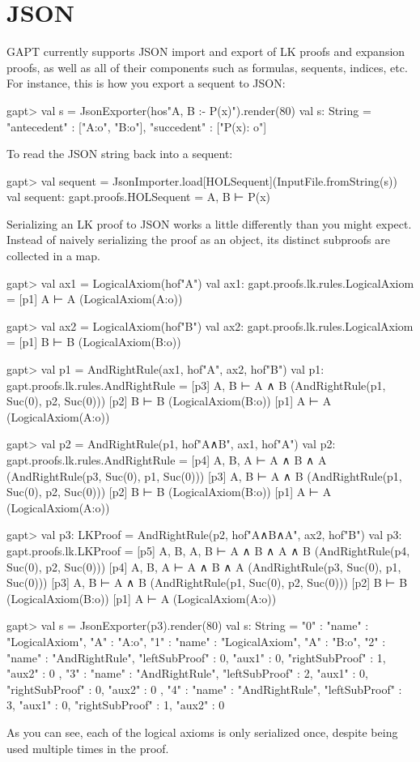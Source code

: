 \documentclass[a4paper,11pt]{book}
\begin{document}
\section{JSON}
GAPT currently supports JSON import and export of LK proofs and expansion proofs,
as well as all of their components such as formulas, sequents, indices, etc. For
instance, this is how you export a sequent to JSON:
\begin{clilisting}
gapt> val s = JsonExporter(hos"A, B :- P(x)").render(80)
val s: String = {"antecedent" : ["A:o", "B:o"], "succedent" : ["P(x): o"]}

\end{clilisting}
To read the JSON string back into a sequent:
\begin{clilisting}
gapt> val sequent = JsonImporter.load[HOLSequent](InputFile.fromString(s))
val sequent: gapt.proofs.HOLSequent = A, B ⊢ P(x)

\end{clilisting}
Serializing an LK proof to JSON works a little differently than you might
expect. Instead of naively serializing the proof as an object, its distinct
subproofs are collected in a map.
\begin{clilisting}
gapt> val ax1 = LogicalAxiom(hof"A")
val ax1: gapt.proofs.lk.rules.LogicalAxiom =
[p1] A ⊢ A    (LogicalAxiom(A:o))

gapt> val ax2 = LogicalAxiom(hof"B")
val ax2: gapt.proofs.lk.rules.LogicalAxiom =
[p1] B ⊢ B    (LogicalAxiom(B:o))

gapt> val p1 = AndRightRule(ax1, hof"A", ax2, hof"B")
val p1: gapt.proofs.lk.rules.AndRightRule =
[p3] A, B ⊢ A ∧ B    (AndRightRule(p1, Suc(0), p2, Suc(0)))
[p2] B ⊢ B    (LogicalAxiom(B:o))
[p1] A ⊢ A    (LogicalAxiom(A:o))

gapt> val p2 = AndRightRule(p1, hof"A∧B", ax1, hof"A")
val p2: gapt.proofs.lk.rules.AndRightRule =
[p4] A, B, A ⊢ A ∧ B ∧ A    (AndRightRule(p3, Suc(0), p1, Suc(0)))
[p3] A, B ⊢ A ∧ B    (AndRightRule(p1, Suc(0), p2, Suc(0)))
[p2] B ⊢ B    (LogicalAxiom(B:o))
[p1] A ⊢ A    (LogicalAxiom(A:o))

gapt> val p3: LKProof = AndRightRule(p2, hof"A∧B∧A", ax2, hof"B")
val p3: gapt.proofs.lk.LKProof =
[p5] A, B, A, B ⊢ A ∧ B ∧ A ∧ B    (AndRightRule(p4, Suc(0), p2, Suc(0)))
[p4] A, B, A ⊢ A ∧ B ∧ A    (AndRightRule(p3, Suc(0), p1, Suc(0)))
[p3] A, B ⊢ A ∧ B    (AndRightRule(p1, Suc(0), p2, Suc(0)))
[p2] B ⊢ B    (LogicalAxiom(B:o))
[p1] A ⊢ A    (LogicalAxiom(A:o))

gapt> val s = JsonExporter(p3).render(80)
val s: String =
{
  "0" : {"name" : "LogicalAxiom", "A" : "A:o"},
  "1" : {"name" : "LogicalAxiom", "A" : "B:o"},
  "2" : {
    "name" : "AndRightRule",
    "leftSubProof" : 0,
    "aux1" : 0,
    "rightSubProof" : 1,
    "aux2" : 0
  },
  "3" : {
    "name" : "AndRightRule",
    "leftSubProof" : 2,
    "aux1" : 0,
    "rightSubProof" : 0,
    "aux2" : 0
  },
  "4" : {
    "name" : "AndRightRule",
    "leftSubProof" : 3,
    "aux1" : 0,
    "rightSubProof" : 1,
    "aux2" : 0
  }
}

\end{clilisting}
As you can see, each of the logical axioms is only serialized once, despite being
used multiple times in the proof.
\end{document}
